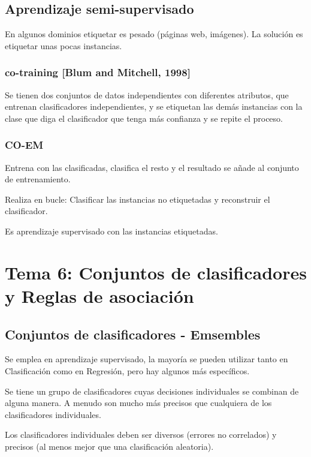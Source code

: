 \documentclass[12pt, twoside, openright]{report} %
\begin{document}
\section{Aprendizaje semi-supervisado}

En algunos dominios etiquetar es pesado (páginas web, imágenes). La solución es etiquetar unas pocas instancias.

\subsection{co-training [Blum and Mitchell, 1998]}

Se tienen dos conjuntos de datos independientes con diferentes atributos, que entrenan clasificadores independientes, y se etiquetan las demás instancias con la clase que diga el clasificador que tenga más confianza y se repite el proceso.

\subsection{CO-EM}

Entrena con las clasificadas, clasifica el resto y el resultado se añade al conjunto de entrenamiento.

Realiza en bucle: Clasificar las instancias no etiquetadas y reconstruir el clasificador.

Es aprendizaje supervisado con las instancias etiquetadas.

\chapter{Tema 6: Conjuntos de clasificadores y Reglas de asociación}
\section{Conjuntos de clasificadores - Emsembles}
Se emplea en aprendizaje supervisado, la mayoría se pueden utilizar tanto en Clasificación como en Regresión, pero hay algunos más específicos.

Se tiene un grupo de clasificadores cuyas decisiones individuales se combinan de alguna manera. A menudo son mucho más precisos que cualquiera de los clasificadores individuales.

Los clasificadores individuales deben ser diversos (errores no correlados) y precisos (al menos mejor que una clasificación aleatoria).
\end{document}

